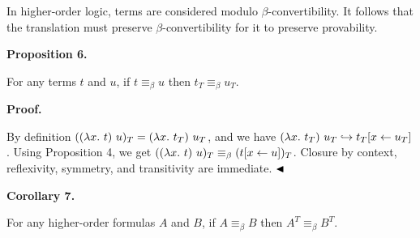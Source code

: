  
In higher-order logic, terms are considered modulo $\beta$-convertibility. It follows that the translation must preserve $\beta$-convertibility for it to preserve provability.\par
 
 
 
\par\medskip\noindent\textbf{Proposition 6.}\par
 
 
For any terms $t$ and $u$, if $t\equiv_{\beta}u$ then $t_{T}\equiv_{\beta}u_{T}$.\par
 
 
 
 
 
\par\medskip\noindent\textbf{Proof.}\par
 
 
By definition $((\lambda x.\leavevmode\nobreak\ t)\leavevmode\nobreak\ u)_{T}=(\lambda x.\leavevmode\nobreak\ t_{T})\leavevmode\nobreak\ u_{T}$, and we have $(\lambda x.\leavevmode\nobreak\ t_{T})\leavevmode\nobreak\ u_{T}\hookrightarrow t_{T}[x\leftarrow u_{T}]$. Using Proposition 4, we get $((\lambda x.\leavevmode\nobreak\ t)\leavevmode\nobreak\ u)_{T}\equiv_{\beta}(t[x\leftarrow u])_{T}$. Closure by context, reflexivity, symmetry, and transitivity are immediate. $\hfill\blacktriangleleft$\par
 
 
 
\par\medskip\noindent\textbf{Corollary 7.}\par
 
 
For any higher-order formulas $A$ and $B$, if $A\equiv_{\beta}B$ then $A^{T}\equiv_{\beta}B^{T}$.\par
 
 
 
